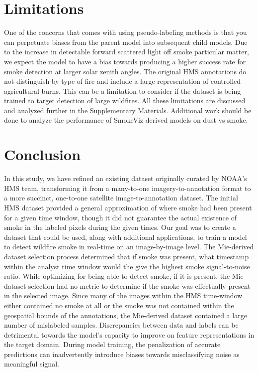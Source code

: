 \documentclass{article}
\begin{document}
\section{Limitations}

One of the concerns that comes with using pseudo-labeling methods is that you can perpetuate biases from the parent model into subsequent child models. Due to the increase in detectable forward scattered light off smoke particular matter, we expect the model to have a bias towards producing a higher success rate for smoke detection at larger solar zenith angles. The original HMS annotations do not distinguish by type of fire and include a large representation of controlled agricultural burns. This can be a limitation to consider if the dataset is being trained to target detection of large wildfires. All these limitations are discussed and analyzed further in the Supplementary Materials. Additional work should be done to analyze the performance of SmokeViz derived models on dust vs smoke.

\section{Conclusion}

In this study, we have refined an existing dataset originally curated by NOAA's HMS team, transforming it from a many-to-one imagery-to-annotation format to a more succinct, one-to-one satellite image-to-annotation dataset. The initial HMS dataset provided a general approximation of where smoke had been present for a given time window, though it did not guarantee the actual existence of smoke in the labeled pixels during the given times. Our goal was to create a dataset that could be used, along with additional applications, to train a model to detect wildfire smoke in real-time on an image-by-image level. The Mie-derived dataset selection process determined that if smoke was present, what timestamp within the analyst time window would the give the highest smoke signal-to-noise ratio. While optimizing for being able to detect smoke, if it is present, the Mie-dataset selection had no metric to determine if the smoke was effectually present in the selected image. Since many of the images within the HMS time-window either contained no smoke at all or the smoke was not contained within the geospatial bounds of the annotations, the Mie-derived dataset contained a large number of mislabeled samples. Discrepancies between data and labels can be detrimental towards the model's capacity to improve on feature representations in the target domain. During model training, the penalization of accurate predictions can inadvertently introduce biases towards misclassifying noise as meaningful signal. 
\end{document}
